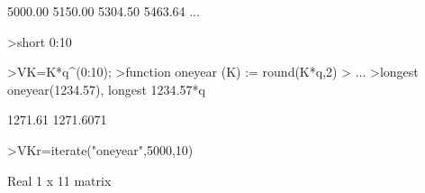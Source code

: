\documentclass[a4paper,10pt]{article}
\begin{document}
\begin{eulernotebook}
\begin{eulercomment}
\begin{eulercomment}
\begin{eulercomment}
\begin{eulercomment}
\begin{eulercomment}
\begin{eulercomment}
\begin{eulercomment}
\begin{eulercomment}
\begin{eulercomment}
\begin{eulercomment}
\begin{eulercomment}
\begin{eulercomment}
\begin{eulercomment}
\begin{eulercomment}
\begin{eulercomment}
\begin{eulercomment}
\begin{eulercomment}
\begin{eulercomment}
\begin{eulercomment}
\begin{eulercomment}
\begin{eulercomment}
\begin{eulercomment}
\begin{eulercomment}
\begin{eulercomment}
\begin{eulercomment}
\begin{eulercomment}
\begin{eulercomment}
\begin{eulercomment}
\begin{eulercomment}
\begin{eulercomment}
\begin{eulercomment}
\begin{eulercomment}
\begin{euleroutput}
      5000.00     5150.00     5304.50     5463.64     ...
\end{euleroutput}
\begin{eulerprompt}
>short 0:10
\end{eulerprompt}
\begin{euleroutput}
  [0,  1,  2,  3,  4,  5,  6,  7,  8,  9,  10]
\end{euleroutput}
\begin{eulerprompt}
>VK=K*q^(0:10);
>function oneyear (K) := round(K*q,2)
> ...
>longest oneyear(1234.57), longest 1234.57*q
\end{eulerprompt}
\begin{euleroutput}
                  1271.61 
                1271.6071 
\end{euleroutput}
\begin{eulerprompt}
>VKr=iterate("oneyear",5000,10)
\end{eulerprompt}
\begin{euleroutput}
  Real 1 x 11 matrix
  

\end{euleroutput}
\end{eulercomment}
\end{eulercomment}
\end{eulercomment}
\end{eulercomment}
\end{eulercomment}
\end{eulercomment}
\end{eulercomment}
\end{eulercomment}
\end{eulercomment}
\end{eulercomment}
\end{eulercomment}
\end{eulercomment}
\end{eulercomment}
\end{eulercomment}
\end{eulercomment}
\end{eulercomment}
\end{eulercomment}
\end{eulercomment}
\end{eulercomment}
\end{eulercomment}
\end{eulercomment}
\end{eulercomment}
\end{eulercomment}
\end{eulercomment}
\end{eulercomment}
\end{eulercomment}
\end{eulercomment}
\end{eulercomment}
\end{eulercomment}
\end{eulercomment}
\end{eulercomment}
\end{eulercomment}
\end{eulernotebook}
\end{document}
